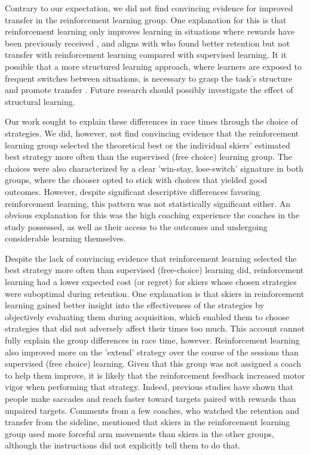 \documentclass[pdflatex,sn-mathphys-num]{sn-jnl}%
\theoremstyle{thmstyleone}%
\theoremstyle{thmstyletwo}%
\theoremstyle{thmstylethree}%
\begin{document}
Contrary to our expectation, we did not find convincing evidence for improved transfer in the reinforcement learning group. One explanation for this is that reinforcement learning only improves learning in situations where rewards have been previously received \cite{robertson_memory_2018}, and aligns with \cite{hasson_reinforcement_2015} who found better retention but not transfer with reinforcement learning compared with supervised learning. It it possible that a more structured learning approach, where learners are exposed to frequent switches between situations, is necessary to grasp the task's structure and promote transfer \cite{braun_structure_2010}. Future research should possibly investigate the effect of structural learning. 

Our work sought to explain these differences in race times through the choice of strategies. We did, however, not find convincing evidence that the reinforcement learning group selected the theoretical best or the individual skiers' estimated best strategy more often than the supervised (free choice) learning group. The choices were also characterized by a clear 'win-stay, lose-switch' signature in both groups, where the chooser opted to stick with choices that yielded good outcomes. However, despite significant descriptive differences favoring reinforcement learning, this pattern was not statistically significant either. An obvious explanation for this was the high coaching experience the coaches in the study possessed, as well as their access to the outcomes and undergoing considerable learning themselves. 

Despite the lack of convincing evidence that reinforcement learning selected the best strategy more often than supervised (free-choice) learning did, reinforcement learning had a lower expected cost (or regret) for skiers whose chosen strategies were suboptimal during retention. One explanation is that skiers in reinforcement learning gained better insight into the effectiveness of the strategies by objectively evaluating them during acquisition, which enabled them to choose strategies that did not adversely affect their times too much. This account cannot fully explain the group differences in race time, however. Reinforcement learning also improved more on the 'extend' strategy over the course of the sessions than supervised (free choice) learning. Given that this group was not assigned a coach to help them improve, it is likely that the reinforcement feedback increased motor vigor \cite{shadmehr_vigor_2020, pietro_mazzoni_why_2007, niv_normative_2006} when performing that strategy. Indeed, previous studies have shown that people make saccades \cite{takikawa_modulation_2002} and reach faster \cite{summerside_vigor_2018} toward targets paired with rewards than unpaired targets. Comments from a few coaches, who watched the retention and transfer from the sideline, mentioned that skiers in the reinforcement learning group used more forceful arm movements than skiers in the other groups, although the instructions did not explicitly tell them to do that.
\end{document}
